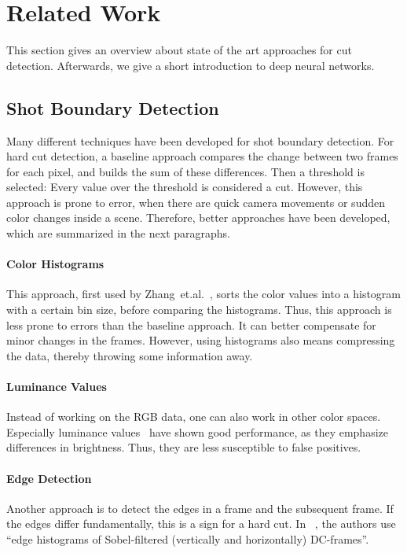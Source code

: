 \section{Related Work}
\label{sec:related_work}

This section gives an overview about state of the art approaches for cut detection.
Afterwards, we give a short introduction to deep neural networks.

\subsection{Shot Boundary Detection}

Many different techniques have been developed for shot boundary detection.
For hard cut detection, a baseline approach compares the change between two frames for each pixel, and builds the sum of these differences.
Then a threshold is selected: Every value over the threshold is considered a cut.
However, this approach is prone to error, when there are quick camera movements or sudden color changes inside a scene.
Therefore, better approaches have been developed, which are summarized in the next paragraphs.

\paragraph{Color Histograms}
This approach, first used by Zhang~et.al.~\cite{zhang1993automatic}, sorts the color values into a histogram with a certain bin size, before comparing the histograms.
Thus, this approach is less prone to errors than the baseline approach.
It can better compensate for minor changes in the frames.
However, using histograms also means compressing the data, thereby throwing some information away.

\paragraph{Luminance Values}
Instead of working on the RGB data, one can also work in other color spaces.
Especially luminance values~\cite{petersohn2004fraunhofer} have shown good performance, as they emphasize differences in brightness.
Thus, they are less susceptible to false positives.

\paragraph{Edge Detection}
Another approach is to detect the edges in a frame and the subsequent frame.
If the edges differ fundamentally, this is a sign for a hard cut.
In ~\cite{ewerth2005university}, the authors use ``edge histograms of Sobel-filtered (vertically and horizontally) DC-frames''.

